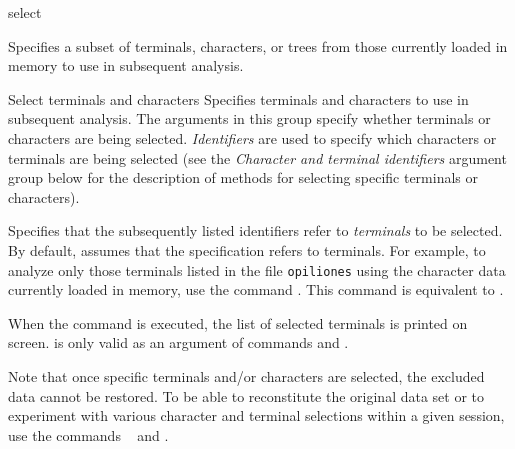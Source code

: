 \begin{command}{select}{}


	\begin{poydescription} 
            Specifies a subset of terminals, characters, or trees from those
            currently loaded in memory to use in subsequent analysis.
	\end{poydescription}
	

	\begin{arguments}
		
		\begin{argumentgroup}{Select terminals and characters}
            {Specifies terminals and characters to use in subsequent
            analysis. 
            The arguments in this group specify whether terminals or characters
            are being selected.
            \emph{Identifiers} are used to specify which characters or
            terminals are being selected (see
            the \emph{Character and terminal identifiers} argument group below
            for the description of methods for selecting specific terminals or characters).}
 
                {Specifies that the subsequently listed identifiers
                refer to \emph{terminals} to be selected. By default, \poy
            assumes that the specification refers to terminals. For example, to
            analyze only those terminals listed in the file \texttt{opiliones} using
            the character data currently loaded in memory, use the command 
            . This  command is
            equivalent to .
            
            When the command is executed, the list of selected terminals is
            printed on screen.   is only valid as an
            argument of commands  and .} 
                {}
	
	\begin{statement}
  	Note that once specific terminals and/or  characters are selected, the excluded
	data cannot be restored. To be able to reconstitute the original data set or to
	experiment with various character and terminal selections within a given \poy
	session, use the commands ~ and .
	\end{statement}
	

\end{argumentgroup}
\end{arguments}
\end{command}
